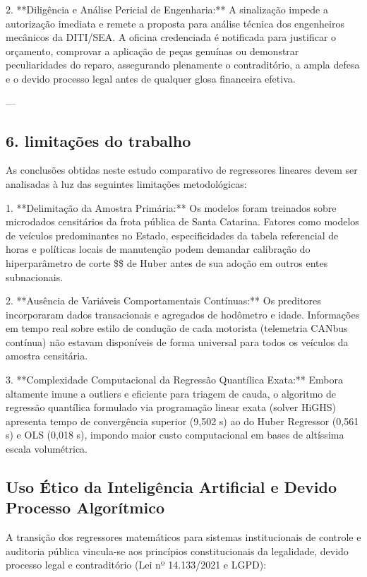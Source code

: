 \documentclass[12pt,a4paper]{article}
\begin{document}
2. **Diligência e Análise Pericial de Engenharia:** A sinalização impede a autorização imediata e remete a proposta para análise técnica dos engenheiros mecânicos da DITI/SEA. A oficina credenciada é notificada para justificar o orçamento, comprovar a aplicação de peças genuínas ou demonstrar peculiaridades do reparo, assegurando plenamente o contraditório, a ampla defesa e o devido processo legal antes de qualquer glosa financeira efetiva.

---


\subsection{6. limitações do trabalho}

As conclusões obtidas neste estudo comparativo de regressores lineares devem ser analisadas à luz das seguintes limitações metodológicas:

1. **Delimitação da Amostra Primária:** Os modelos foram treinados sobre microdados censitários da frota pública de Santa Catarina. Fatores como modelos de veículos predominantes no Estado, especificidades da tabela referencial de horas e políticas locais de manutenção podem demandar calibração do hiperparâmetro de corte \$\epsilon\$ de Huber antes de sua adoção em outros entes subnacionais.

2. **Ausência de Variáveis Comportamentais Contínuas:** Os preditores incorporaram dados transacionais e agregados de hodômetro e idade. Informações em tempo real sobre estilo de condução de cada motorista (telemetria CANbus contínua) não estavam disponíveis de forma universal para todos os veículos da amostra censitária.

3. **Complexidade Computacional da Regressão Quantílica Exata:** Embora altamente imune a outliers e eficiente para triagem de cauda, o algoritmo de regressão quantílica formulado via programação linear exata (solver HiGHS) apresenta tempo de convergência superior (9,502 s) ao do Huber Regressor (0,561 s) e OLS (0,018 s), impondo maior custo computacional em bases de altíssima escala volumétrica.


\subsection{Uso Ético da Inteligência Artificial e Devido Processo Algorítmico}

A transição dos regressores matemáticos para sistemas institucionais de controle e auditoria pública vincula-se aos princípios constitucionais da legalidade, devido processo legal e contraditório (Lei nº 14.133/2021 e LGPD):
\end{document}
